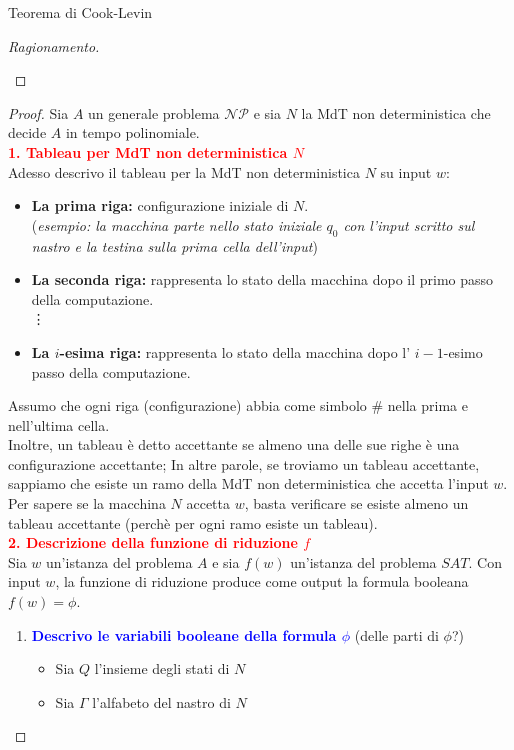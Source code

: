 \documentclass{article}  %
\theoremstyle{definition}
\newenvironment{ragionamento}[1][]
  {\begin{proof}[Ragionamento#1]\renewcommand{\qedsymbol}{}\normalfont}
  {\end{proof}}
\begin{document}
\begin{theorem}{Teorema di Cook-Levin}
\begin{ragionamento}
\begin{itemize}
		\end{itemize}
	\end{ragionamento}
	\begin{proof}
		Sia $A$ un generale problema $\mathcal{NP}$ e sia $N$ la MdT non deterministica che decide $A$ in tempo polinomiale. \\
		\textcolor{red}{\textbf{1. Tableau per MdT non deterministica $N$}} \\
		Adesso descrivo il tableau per la MdT non deterministica $N$ su input $w$:
		\begin{itemize}
			\item \textbf{La prima riga:} configurazione iniziale di $N$. \\
			      (\textit{esempio: la macchina parte nello stato iniziale $q_0$ con l'input scritto sul nastro e la testina sulla prima cella dell'input})
			\item \textbf{La seconda riga:} rappresenta lo stato della macchina dopo il primo passo della computazione. \\
			      \vdots
			\item \textbf{La $i$-esima riga:} rappresenta lo stato della macchina dopo l' $i-1$-esimo passo della computazione.
		\end{itemize}
		Assumo che ogni riga (configurazione) abbia come simbolo \# nella prima e nell'ultima cella. \\
		Inoltre, un tableau è detto accettante se almeno una delle sue righe è una configurazione accettante; In altre parole, se troviamo un tableau accettante,
		sappiamo che esiste un ramo della MdT non deterministica che accetta l'input $w$.
		Per sapere se la macchina $N$ accetta $w$, basta verificare se esiste almeno un tableau accettante (perchè per ogni ramo esiste un tableau). \\
		\textcolor{red}{\textbf{2. Descrizione della funzione di riduzione $f$}} \\
		Sia $w$ un'istanza del problema $A$ e sia $f(w)$ un'istanza del problema $SAT$. Con input $w$, la funzione di riduzione produce come output la formula booleana $f(w)=\phi$. \\
		\begin{enumerate}
			\item \textcolor{blue}{\textbf{Descrivo le variabili booleane della formula $\phi$}} (delle parti di $\phi$?)
			      \begin{itemize}
				      \item Sia $Q$ l'insieme degli stati di $N$
				      \item Sia $\Gamma$ l'alfabeto del nastro di $N$

\end{itemize}
\end{enumerate}
\end{proof}
\end{theorem}
\end{document}
